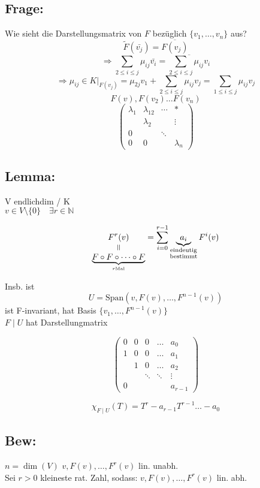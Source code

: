 \documentclass[titlepage,12pt,a4paper,ngerman]{report}
\newcommand{\verteq}{\rotatebox{90}{$\,=$}}
\newcommand{\equalto}[2]{\underset{\scriptstyle\overset{\mkern4mu\verteq}{#2}}{#1}}
\begin{document}
\subsection{Frage:}
Wie sieht die Darstellungsmatrix von $F$ bezüglich $\{v_1, \dots, v_n  \}$ aus?
$$\tilde{F}(\bar{v_j})=\overline{F(v_j)}$$
$$\Rightarrow \sum_{2\leq i\leq j}\mu_{ij}\bar{v_i} = \overline{\sum_{2\leq i\leq j}\mu_{ij}v_i}$$
$$\Rightarrow \mu_{ij} \in K | _{F(v_j)} = \mu_{2j}v_1 + \sum_{2\leq i \leq j}\mu_{ij}v_j = \sum_{1 \leq i \leq j}\mu_{ij}v_j$$
$$F(v), F(v_2) \dots F(v_n) $$
$$\begin{pmatrix}
\lambda_{1} & \lambda_{12} & \cdots &  *\\ 
& \lambda_2 &  &  \vdots\\ 
0 &  & \ddots &  \\ 
0 & 0 &  & \lambda_n
\end{pmatrix} $$

\subsection{Lemma:} V endlichdim / K \\
$v\in V \setminus \{0\} \quad \exists r \in \mathbb{N}$

$$\equalto{F^r(v)}{ \underbrace{F \circ F \circ \dots \circ F}_{r \textrm{Mal}}} = \sum ^{r-1}_{i=0} \underbrace{a_i}_{\substack{\textrm{eindeutig} \\ \textrm{bestimmt}}} F^i(v)$$

Insb. ist
$$U = \textrm{Span}(v, F(v), \dots , F^{n-1}(v))$$
ist F-invariant, hat Basis $\{v_1, \dots, F^{n-1}(v)\}$\\
$F \mid U$ hat Darstellungmatrix

$$\begin{pmatrix}
0 & 0 & 0 & \dots & a_0 \\
1 & 0 & 0 & \dots & a_1 \\
& 1 & 0 & \dots & a_2 \\
&   &   \ddots & \ddots & \vdots \\
0  &   &   &   & a_{r-1}
\end{pmatrix} $$

$$\chi_{F \mid U}(T) = T^r - a_{r-1} T^{r-1} \dots - a_{0}$$
\subsection{Bew:}
$ n = \dim(V)$
$v, F(v), \dots , F^r(v)$ lin. unabh.\\
Sei $r>0$ kleineste rat. Zahl, sodass:
$v,F(v), \dots , F^r(v)$ lin. abh.
\end{document}
